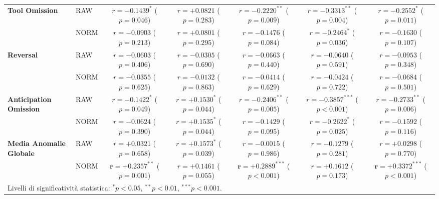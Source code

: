 \begin{table}[H]
{\begin{tabular}{llccccc}
\midrule
\multirow{2}{*}{\textbf{Tool Omission}} 
 & RAW  & $r = -0.1439^*$ ($p = 0.046$) & $r = +0.0821$ ($p = 0.283$) & $r = -0.2220^{**}$ ($p = 0.009$) & $r = -0.3313^{**}$ ($p = 0.004$) & $r = -0.2552^*$ ($p = 0.011$) \\
 & NORM & $r = -0.0903$ ($p = 0.213$) & $r = +0.0801$ ($p = 0.295$) & $r = -0.1476$ ($p = 0.084$) & $r = -0.2464^*$ ($p = 0.036$) & $r = -0.1630$ ($p = 0.107$) \\
\midrule
\multirow{2}{*}{\textbf{Reversal}} 
 & RAW  & $r = -0.0603$ ($p = 0.406$) & $r = -0.0305$ ($p = 0.690$) & $r = -0.0663$ ($p = 0.440$) & $r = -0.0640$ ($p = 0.591$) & $r = -0.0953$ ($p = 0.348$) \\
 & NORM & $r = -0.0355$ ($p = 0.625$) & $r = -0.0132$ ($p = 0.863$) & $r = -0.0414$ ($p = 0.629$) & $r = -0.0424$ ($p = 0.722$) & $r = -0.0684$ ($p = 0.501$) \\
\midrule
\multirow{2}{*}{\textbf{Anticipation Omission}} 
 & RAW  & $r = -0.1422^*$ ($p = 0.049$) & $r = +0.1530^*$ ($p = 0.044$) & $r = -0.2406^{**}$ ($p = 0.005$) & $r = -0.3857^{***}$ ($p < 0.001$) & $r = -0.2733^{**}$ ($p = 0.006$) \\
 & NORM & $r = -0.0624$ ($p = 0.390$) & $r = +0.1535^*$ ($p = 0.044$) & $r = -0.1429$ ($p = 0.095$) & $r = -0.2622^*$ ($p = 0.025$) & $r = -0.1592$ ($p = 0.116$) \\
\midrule
\multirow{2}{*}{\textbf{Media Anomalie Globale}} 
 & RAW  & $r = +0.0321$ ($p = 0.658$) & $r = +0.1573^*$ ($p = 0.039$) & $r = -0.0015$ ($p = 0.986$) & $r = -0.1279$ ($p = 0.281$) & $r = +0.0298$ ($p = 0.770$) \\
 & NORM & $\mathbf{r = +0.2357^{**}}$ ($p = 0.001$) & $r = +0.1461$ ($p = 0.055$) & $\mathbf{r = +0.2889^{***}}$ ($p < 0.001$) & $r = +0.1612$ ($p = 0.173$) & $\mathbf{r = +0.3372^{***}}$ ($p < 0.001$) \\
\bottomrule
\multicolumn{7}{l}{\footnotesize Livelli di significatività statistica: $^*p < 0.05$, $^{**}p < 0.01$, $^{***}p < 0.001$.}
\end{tabular}%
}
\end{table}



